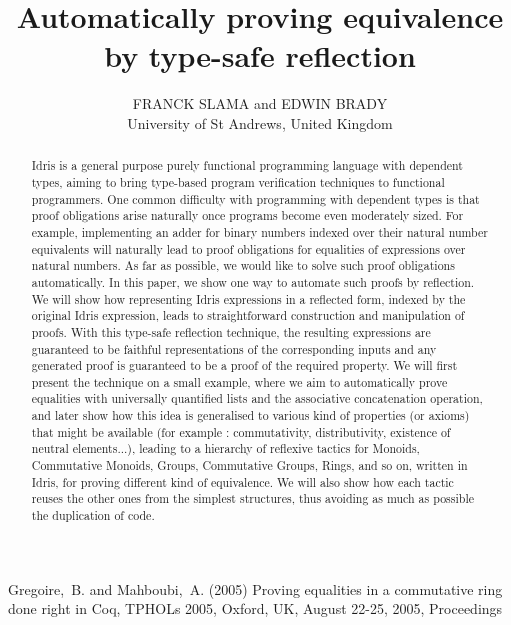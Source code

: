 \documentclass{jfp1}
\title[Automatically proving equivalence by type-safe reflection]
      {Automatically proving equivalence by type-safe reflection}
\author[Franck Slama and Edwin Brady]
        {FRANCK SLAMA and EDWIN BRADY\\
         University of St Andrews, United Kingdom\\
         \email{fs39@st-andrews.ac.uk, ecb10@st-andrews.ac.uk}}
\begin{document}
\label{firstpage}

\maketitle

\begin{abstract}
Idris is a general purpose purely functional programming language with dependent types, aiming to bring type-based program verification techniques to functional programmers. One common difficulty with programming with dependent types is that proof obligations arise naturally once programs become even moderately sized. For example, implementing an adder for binary numbers indexed over their natural number equivalents will naturally lead to proof obligations for equalities of expressions over natural numbers. 
As far as possible, we would like to solve such proof obligations automatically. In this paper, we show one way to automate such proofs by reflection. We will show how representing Idris expressions in a reflected form, indexed by the original Idris expression, leads to straightforward construction and manipulation of proofs.
With this type-safe reflection technique, the resulting expressions are guaranteed to be faithful representations of the corresponding inputs and any generated proof is guaranteed to be a proof of the required property. 
We will first present the technique on a small example, where we aim to automatically prove equalities with universally quantified lists and the associative concatenation operation, and later show how this idea is generalised to various kind of properties (or axioms) that might be available (for example : commutativity, distributivity, existence of neutral elements...), leading to a hierarchy of reflexive tactics for Monoids, Commutative Monoids, Groups, Commutative Groups, Rings, and so on, written in Idris, for proving different kind of equivalence. We will also show how each tactic reuses the other ones from the simplest structures, thus avoiding as much as possible the duplication of code.
\end{abstract}

















\begin{thebibliography}{}
   Gregoire,~B. and Mahboubi,~A. (2005) Proving equalities in a commutative ring done right in Coq, TPHOLs 2005, Oxford, UK, August 22-25, 2005, Proceedings

\end{thebibliography}

\label{lastpage}
\end{document}
